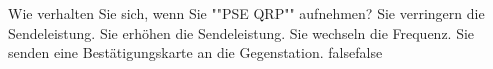     {Wie verhalten Sie sich, wenn Sie ""PSE QRP"" aufnehmen?}
    {Sie verringern die Sendeleistung.}
    {Sie erhöhen die Sendeleistung.}
    {Sie wechseln die Frequenz.}
    {Sie senden eine Bestätigungskarte an die Gegenstation.}
    {false}{false}